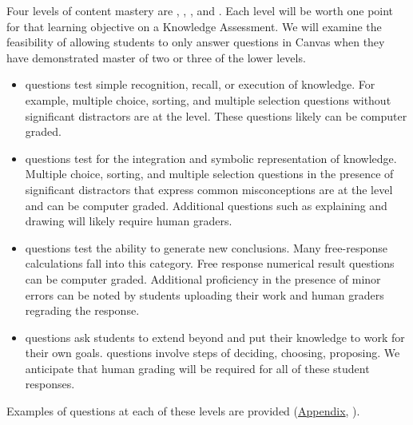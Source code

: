 \documentclass[10pt,letterpaper]{article}
\begin{document}

 Four levels of content mastery are \recall, \comprehension, \analysis, and \use. Each level will be worth one point for that learning objective on a Knowledge Assessment. We will examine the feasibility of allowing students to only answer \use questions in Canvas when they have demonstrated master of two or three of the lower levels. 

\begin{itemize}
\item \Recall questions test simple recognition, recall, or execution of knowledge. For example, multiple choice, sorting, and multiple selection questions without significant distractors are at the \recall level. These questions likely can be computer graded. %

\item \Comprehension questions test for the integration and symbolic representation of knowledge. Multiple choice, sorting, and multiple selection questions in the presence of significant distractors that express common misconceptions are at the \comprehension level and can be computer graded. Additional questions such as explaining and drawing will likely require human graders.  

\item \Analysis questions test the ability to generate new conclusions. Many free-response calculations fall into this category. Free response numerical result questions can be computer graded. Additional proficiency in the presence of minor errors can be noted by students uploading their work and human graders regrading the response.

\item \Use questions ask students to extend beyond \analysis and put their knowledge to work for their own goals. \Use questions involve steps of deciding, choosing, proposing. We anticipate that human grading will be required for all of these student responses.
\end{itemize}
Examples of questions at each of these levels are provided (\hyperref[app:example_questions]{Appendix}, ).
%
\end{document}
